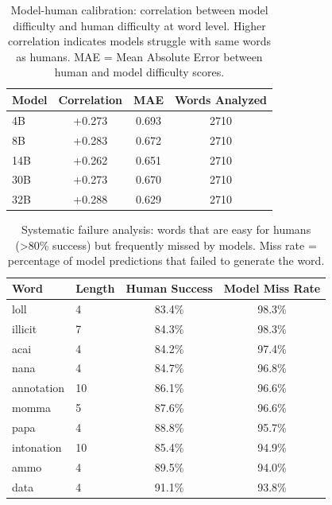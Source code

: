 
\begin{table}[t]
\centering
\small
\caption{Model-human calibration: correlation between model difficulty and human difficulty at word level. Higher correlation indicates models struggle with same words as humans. MAE = Mean Absolute Error between human and model difficulty scores.}
\label{tab:calibration}
\begin{tabular}{lccc}
\toprule
\textbf{Model} & \textbf{Correlation} & \textbf{MAE} & \textbf{Words Analyzed} \\
\midrule
4B  & +0.273 & 0.693 & 2710 \\
8B  & +0.283 & 0.672 & 2710 \\
14B & +0.262 & 0.651 & 2710 \\
30B & +0.273 & 0.670 & 2710 \\
32B & +0.288 & 0.629 & 2710 \\
\bottomrule
\end{tabular}
\end{table}




\begin{table}[t]
\centering
\small
\caption{Systematic failure analysis: words that are easy for humans (>80\% success) but frequently missed by models. Miss rate = percentage of model predictions that failed to generate the word.}
\label{tab:failure_analysis}
\begin{tabular}{llcc}
\toprule
\textbf{Word} & \textbf{Length} & \textbf{Human Success} & \textbf{Model Miss Rate} \\
\midrule
loll         & 4 & 83.4\% & 98.3\% \\
illicit      & 7 & 84.3\% & 98.3\% \\
acai         & 4 & 84.2\% & 97.4\% \\
nana         & 4 & 84.7\% & 96.8\% \\
annotation   & 10 & 86.1\% & 96.6\% \\
momma        & 5 & 87.6\% & 96.6\% \\
papa         & 4 & 88.8\% & 95.7\% \\
intonation   & 10 & 85.4\% & 94.9\% \\
ammo         & 4 & 89.5\% & 94.0\% \\
data         & 4 & 91.1\% & 93.8\% \\
\bottomrule
\end{tabular}
\end{table}